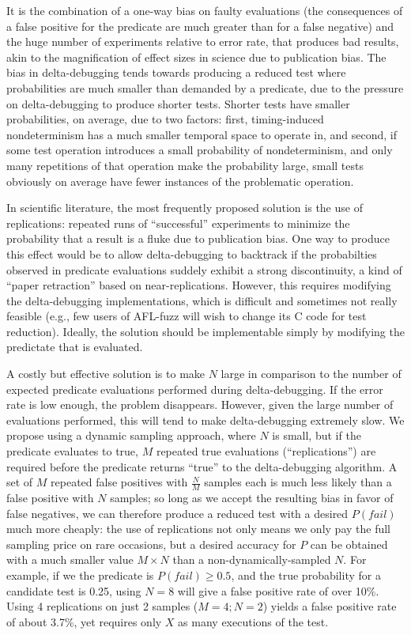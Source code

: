 It is the combination of
a one-way bias on faulty evaluations (the consequences of a false
positive for the predicate are much greater than for a false negative)
and the huge number of experiments relative to error rate, that
produces bad results, akin to the magnification of effect sizes
in science due to publication bias.  The bias in delta-debugging tends
towards producing a reduced test where probabilities are much smaller
than demanded by a predicate, due to the pressure on delta-debugging
to produce shorter tests.  Shorter tests have smaller probabilities,
on average, due to two factors:  first, timing-induced nondeterminism
has a much smaller temporal space to operate in, and second, if some
test operation introduces a small probability of nondeterminism, and
only many repetitions of that operation make the probability large,
small tests obviously on average have fewer instances of the
problematic operation.

In scientific literature, the most frequently proposed solution is the
use of replications:  repeated runs of ``successful'' experiments to
minimize the probability that a result is a fluke due to publication
bias.  One way to produce this effect would be to allow
delta-debugging to backtrack if the probabilties observed in predicate
evaluations suddely exhibit a strong discontinuity, a kind of ``paper
retraction'' based on near-replications.  However, this requires
modifying the delta-debugging implementations, which is difficult and
sometimes not really feasible (e.g., few users of AFL-fuzz \cite{aflfuzz} will wish
to change its C code for test reduction).  Ideally, the solution
should be implementable simply by modifying the predictate that is
evaluated.  

A costly but effective solution is to make $N$ large in comparison to
the number of expected predicate evaluations performed during
delta-debugging.  If the error rate is low enough, the problem
disappears.  However, given the large number of evaluations performed,
this will tend to make delta-debugging extremely slow.  We propose
using a dynamic sampling approach, where $N$ is small, but if the
predicate evaluates to true, $M$ repeated true evaluations
(``replications'') are
required before the predicate returns ``true'' to the delta-debugging
algorithm.  A set of $M$ repeated false positives with
$\frac{N}{M}$ samples each is much less likely than a false positive
with $N$ samples; so long as we accept the resulting bias in favor of
false negatives, we can therefore produce a reduced test with a
desired $P(fail)$ much more cheaply:  the use of replications not only
means we only pay the full sampling price on rare occasions, but a
desired accuracy for $P$ can be obtained with a much smaller value $M
\times N$ than a non-dynamically-sampled $N$.  For example, if we the predicate
is $P(fail) \geq 0.5$, and the true probability for a candidate test
is 0.25, using $N=8$ will give a false positive rate of over 10\%.
Using 4 replications on just 2 samples ($M=4;N=2$) yields a false
positive rate of about 3.7\%, yet requires only $X$ as many
executions of the test.

